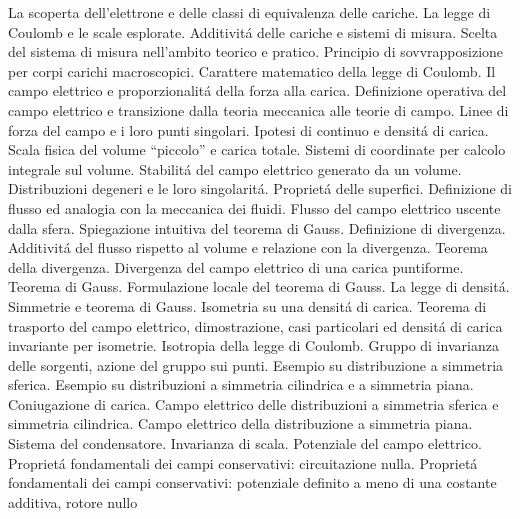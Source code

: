 \begin{multicols}{3}
  La scoperta dell'elettrone e delle classi di equivalenza delle cariche. La legge di Coulomb e le scale esplorate.
  Additivit\'a delle cariche e sistemi di misura.
  Scelta del sistema di misura nell'ambito teorico e pratico. Principio di sovvrapposizione per corpi carichi macroscopici.
  Carattere matematico della legge di Coulomb. Il campo elettrico e proporzionalit\'a della forza alla carica.
  Definizione operativa del campo elettrico e transizione dalla teoria meccanica alle teorie di campo.
  Linee di forza del campo e i loro punti singolari. Ipotesi di continuo e densit\'a di carica.
  Scala fisica del volume ``piccolo'' e carica totale.
  Sistemi di coordinate per calcolo integrale sul volume.
  Stabilit\'a del campo elettrico generato da un volume. Distribuzioni degeneri e le loro singolarit\'a.
  Propriet\'a delle superfici. Definizione di flusso ed analogia con la meccanica dei fluidi.
  Flusso del campo elettrico uscente dalla sfera. Spiegazione intuitiva del teorema di Gauss. Definizione di divergenza.
  Additivit\'a del flusso rispetto al volume e relazione con la divergenza. Teorema della divergenza.
  Divergenza del campo elettrico di una carica puntiforme. Teorema di Gauss.
  Formulazione locale del teorema di Gauss. La legge di densit\'a.
  Simmetrie e teorema di Gauss. Isometria su una densit\'a di carica.
  Teorema di trasporto del campo elettrico, dimostrazione, casi particolari ed densit\'a di carica invariante per isometrie.
  Isotropia della legge di Coulomb. Gruppo di invarianza delle sorgenti, azione del gruppo sui punti.
  Esempio su distribuzione a simmetria sferica.
  Esempio su distribuzioni a simmetria cilindrica e a simmetria piana. Coniugazione di carica.
  Campo elettrico delle distribuzioni a simmetria sferica e simmetria cilindrica.
  Campo elettrico della distribuzione a simmetria piana.
  Sistema del condensatore.
  Invarianza di scala. Potenziale del campo elettrico. Propriet\'a fondamentali dei campi conservativi: circuitazione nulla.
  Propriet\'a fondamentali dei campi conservativi: potenziale definito a meno di una costante additiva, rotore nullo

\end{multicols}
